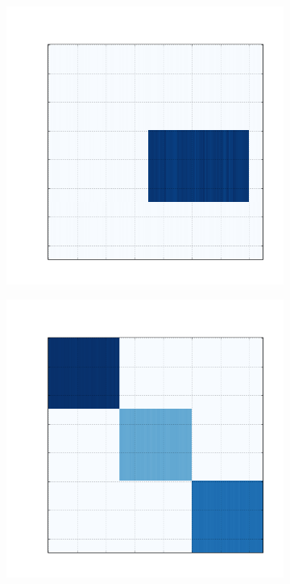 \documentclass[
    12pt,                %
    oneside,            %
    a4paper,            %
    english,            %
    brazil                %
    ]{abntex2ppgsi}
\begin{document}
\begin{figure}[H]
    \begin{subfigure}[b]{0.18\textwidth}
        \includegraphics[width=\textwidth]{img/a-reconstruction-fkmeans.png}
        \caption{}
    \end{subfigure}
    \begin{subfigure}[b]{0.18\textwidth}
        \includegraphics[width=\textwidth]{img/b-reconstruction-fkmeans.png}

\end{subfigure}
\end{figure}
\end{document}
